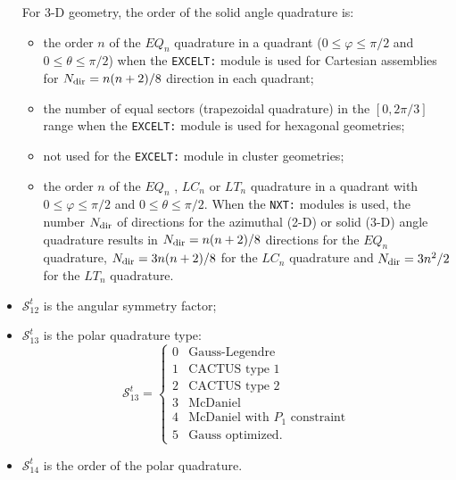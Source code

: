 \begin{itemize}
For 3-D geometry, the order of the solid angle quadrature is: 
\begin{itemize}
\item the order $n$ of the $EQ_n$ quadrature in a quadrant ($0\le \varphi\le \pi/2$ and $0\le \theta \le \pi/2$) when the
{\tt EXCELT:} module is used for Cartesian assemblies for $N_{\rm dir}=n(n+2)/8$ direction in each 
quadrant; 
\item the number of equal sectors (trapezoidal quadrature) in the $[0,2\pi/3]$ range when the {\tt EXCELT:} module 
is used for hexagonal geometries; 
\item not used for the {\tt EXCELT:} module in cluster geometries; 
\item the order $n$ of the $EQ_n$ , $LC_n$ or $LT_n$ quadrature in a quadrant with $0\le \varphi\le \pi/2$ and $0\le \theta \le \pi/2$.
When the {\tt NXT:} modules is used, the number $N_{\rm dir}$ of directions for the azimuthal (2-D) or solid (3-D) angle quadrature
results in $N_{\rm dir}=n(n+2)/8$ directions for the $EQ_n$ quadrature, 
$N_{\rm dir}=3n(n+2)/8$ for the $LC_n$ quadrature and $N_{\rm dir}=3n^2/2$ for the $LT_n$ quadrature.
\end{itemize}

\item $\mathcal{S}^{t}_{12}$ is the angular symmetry factor;

\item $\mathcal{S}^{t}_{13}$ is the polar quadrature type:
\begin{displaymath}
\mathcal{S}^{t}_{13} = \left\{
\begin{array}{rl}
 0 & \textrm{Gauss-Legendre} \\
 1 & \textrm{CACTUS type 1} \\
 2 & \textrm{CACTUS type 2} \\
 3 & \textrm{McDaniel} \\
 4 & \textrm{McDaniel with $P_1$ constraint} \\
 5 & \textrm{Gauss optimized.}
\end{array} \right.
\end{displaymath}

\item $\mathcal{S}^{t}_{14}$ is the order of the polar quadrature.


\end{itemize}
